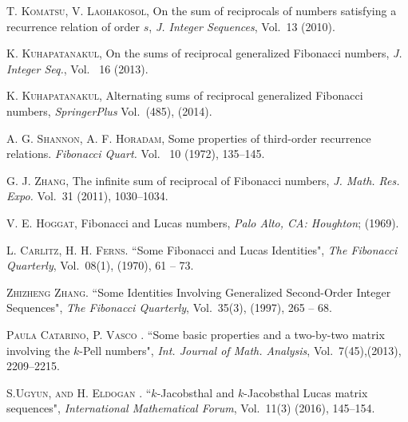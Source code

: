\begin{thebibliography}{00}
\textsc{T. Komatsu, V. Laohakosol}, On the sum of reciprocals of numbers satisfying a recurrence relation of order $s$, \emph{ J. Integer Sequences}, {Vol.~13} (2010).

\textsc{K. Kuhapatanakul}, On the sums of reciprocal generalized Fibonacci numbers, \emph{ J. Integer Seq.}, {Vol.~ 16} (2013).

\textsc{K. Kuhapatanakul}, Alternating sums of reciprocal generalized Fibonacci  numbers, \emph{ SpringerPlus} Vol.~(485), (2014). 

\textsc{A. G. Shannon, A. F. Horadam}, Some properties of third-order recurrence relations. \emph{ Fibonacci Quart.} {Vol.~ 10} (1972), 135--145.

\textsc{G. J. Zhang}, The infinite sum of reciprocal of Fibonacci numbers, \emph{ J. Math. Res. Expo.} {Vol.~31} (2011), 1030--1034.

\textsc{V. E. Hoggat}, Fibonacci and Lucas numbers, \emph{Palo Alto, CA:  Houghton}; (1969).

\textsc{L. Carlitz, H. H. Ferns}. {``Some Fibonacci and Lucas Identities"}, \emph{ The Fibonacci Quarterly}, Vol.~{08(1)}, (1970), 61 -- 73. %

\textsc{Zhizheng Zhang}. {``Some Identities Involving Generalized Second-Order Integer Sequences"}, \emph{ The Fibonacci Quarterly}, Vol.~{35(3)}, (1997), 265 -- 68. %

\textsc{Paula Catarino, P. Vasco }. ``Some basic properties and a two-by-two matrix involving the $k$-Pell numbers", \emph{Int. Journal of Math. Analysis}, Vol.~{7(45)},(2013), 2209--2215.%

\textsc{S.Ugyun,  and H. Eldogan }. {``$k$-Jacobsthal and $k$-Jacobsthal Lucas matrix sequences"}, \emph{International Mathematical Forum}, Vol.~{11(3)} (2016), 145--154.%


\end{thebibliography}
